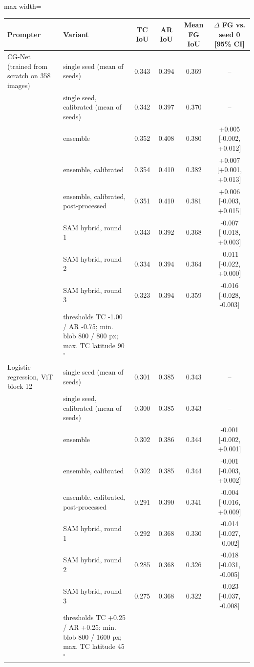 \begin{table}[htbp]
\centering
\small
\begin{adjustbox}{max width=\linewidth}
\begin{tabular}{llcccc}
\toprule
Prompter & Variant & TC IoU & AR IoU & Mean FG IoU & $\Delta$ FG vs. seed 0 [95\% CI] \\
\midrule
CG-Net (trained from scratch on 358 images) & single seed (mean of seeds) & 0.343 & 0.394 & 0.369 & -- \\
 & single seed, calibrated (mean of seeds) & 0.342 & 0.397 & 0.370 & -- \\
 & ensemble & 0.352 & 0.408 & 0.380 & +0.005 [-0.002, +0.012] \\
 & ensemble, calibrated & 0.354 & 0.410 & 0.382 & +0.007 [+0.001, +0.013] \\
 & ensemble, calibrated, post-processed & 0.351 & 0.410 & 0.381 & +0.006 [-0.003, +0.015] \\
 & SAM hybrid, round 1 & 0.343 & 0.392 & 0.368 & -0.007 [-0.018, +0.003] \\
 & SAM hybrid, round 2 & 0.334 & 0.394 & 0.364 & -0.011 [-0.022, +0.000] \\
 & SAM hybrid, round 3 & 0.323 & 0.394 & 0.359 & -0.016 [-0.028, -0.003] \\
 & \footnotesize thresholds TC -1.00 / AR -0.75; min. blob 800 / 800 px; max. TC latitude 90$^\circ$ &  &  &  &  \\
\midrule
Logistic regression, ViT block 12 & single seed (mean of seeds) & 0.301 & 0.385 & 0.343 & -- \\
 & single seed, calibrated (mean of seeds) & 0.300 & 0.385 & 0.343 & -- \\
 & ensemble & 0.302 & 0.386 & 0.344 & -0.001 [-0.002, +0.001] \\
 & ensemble, calibrated & 0.302 & 0.385 & 0.344 & -0.001 [-0.003, +0.002] \\
 & ensemble, calibrated, post-processed & 0.291 & 0.390 & 0.341 & -0.004 [-0.016, +0.009] \\
 & SAM hybrid, round 1 & 0.292 & 0.368 & 0.330 & -0.014 [-0.027, -0.002] \\
 & SAM hybrid, round 2 & 0.285 & 0.368 & 0.326 & -0.018 [-0.031, -0.005] \\
 & SAM hybrid, round 3 & 0.275 & 0.368 & 0.322 & -0.023 [-0.037, -0.008] \\
 & \footnotesize thresholds TC +0.25 / AR +0.25; min. blob 800 / 1600 px; max. TC latitude 45$^\circ$ &  &  &  &  \\

\end{tabular}
\end{adjustbox}
\end{table}
